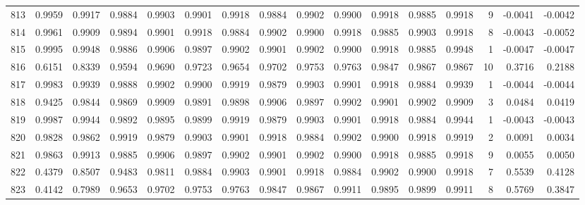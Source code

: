\begin{tabular}{lrrrrrrrrrrrrrrr}
813 &      0.9959 &  0.9917 &  0.9884 &  0.9903 &  0.9901 &  0.9918 &  0.9884 &  0.9902 &  0.9900 &  0.9918 &   0.9885 &     0.9918 &      9 &                   -0.0041 &                    -0.0042 \\
814 &      0.9961 &  0.9909 &  0.9894 &  0.9901 &  0.9918 &  0.9884 &  0.9902 &  0.9900 &  0.9918 &  0.9885 &   0.9903 &     0.9918 &      8 &                   -0.0043 &                    -0.0052 \\
815 &      0.9995 &  0.9948 &  0.9886 &  0.9906 &  0.9897 &  0.9902 &  0.9901 &  0.9902 &  0.9900 &  0.9918 &   0.9885 &     0.9948 &      1 &                   -0.0047 &                    -0.0047 \\
816 &      0.6151 &  0.8339 &  0.9594 &  0.9690 &  0.9723 &  0.9654 &  0.9702 &  0.9753 &  0.9763 &  0.9847 &   0.9867 &     0.9867 &     10 &                    0.3716 &                     0.2188 \\
817 &      0.9983 &  0.9939 &  0.9888 &  0.9902 &  0.9900 &  0.9919 &  0.9879 &  0.9903 &  0.9901 &  0.9918 &   0.9884 &     0.9939 &      1 &                   -0.0044 &                    -0.0044 \\
818 &      0.9425 &  0.9844 &  0.9869 &  0.9909 &  0.9891 &  0.9898 &  0.9906 &  0.9897 &  0.9902 &  0.9901 &   0.9902 &     0.9909 &      3 &                    0.0484 &                     0.0419 \\
819 &      0.9987 &  0.9944 &  0.9892 &  0.9895 &  0.9899 &  0.9919 &  0.9879 &  0.9903 &  0.9901 &  0.9918 &   0.9884 &     0.9944 &      1 &                   -0.0043 &                    -0.0043 \\
820 &      0.9828 &  0.9862 &  0.9919 &  0.9879 &  0.9903 &  0.9901 &  0.9918 &  0.9884 &  0.9902 &  0.9900 &   0.9918 &     0.9919 &      2 &                    0.0091 &                     0.0034 \\
821 &      0.9863 &  0.9913 &  0.9885 &  0.9906 &  0.9897 &  0.9902 &  0.9901 &  0.9902 &  0.9900 &  0.9918 &   0.9885 &     0.9918 &      9 &                    0.0055 &                     0.0050 \\
822 &      0.4379 &  0.8507 &  0.9483 &  0.9811 &  0.9884 &  0.9903 &  0.9901 &  0.9918 &  0.9884 &  0.9902 &   0.9900 &     0.9918 &      7 &                    0.5539 &                     0.4128 \\
823 &      0.4142 &  0.7989 &  0.9653 &  0.9702 &  0.9753 &  0.9763 &  0.9847 &  0.9867 &  0.9911 &  0.9895 &   0.9899 &     0.9911 &      8 &                    0.5769 &                     0.3847 \\

\end{tabular}
